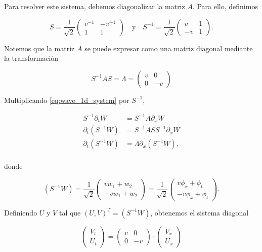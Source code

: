 \documentclass[12pt]{article}
\begin{document}
Para resolver este sistema, debemos diagonalizar la matriz $A$. Para ello, definimos

\begin{equation}
S = \dfrac{1}{\sqrt{2}}
\begin{pmatrix}
v^{-1} & -v^{-1} \\
1 & 1
\end{pmatrix} \quad \text{y} \quad
S^{-1} = \dfrac{1}{\sqrt{2}} 
\begin{pmatrix}
v & 1 \\
-v & 1
\end{pmatrix}.
\end{equation}

Notemos que la matriz $A$ se puede expresar como una matriz diagonal mediante la transformaci\'on 

\begin{equation}
S^{-1} A S = \Lambda = \begin{pmatrix}
v & 0 \\
0 & -v
\end{pmatrix}
\end{equation}

Multiplicando \ref{eq:wave_1d_system} por $S^{-1}$,

\begin{align*}
S^{-1} \partial_t W &= S^{-1} A \partial_x W \\
\partial_t \left( S^{-1} W \right) &= S^{-1} A S S^{-1} \partial_x W \\
\partial_t \left( S^{-1} W \right) &= \Lambda \partial_x \left( S^{-1} W \right), \\
\end{align*}

donde 

\begin{equation}
\left( S^{-1} W \right) = \dfrac{1}{\sqrt{2}} 
\begin{pmatrix}
v w_1 + w_2 \\
-v w_1 + w_2
\end{pmatrix} =
\dfrac{1}{\sqrt{2}} 
\begin{pmatrix}
v \phi_x + \phi_t \\
-v \phi_x + \phi_t
\end{pmatrix}. 
\end{equation}

Definiendo $U$ y $V$ tal que $(U, V)^T = (S^{-1}W)$, obtenemos el sistema diagonal

\begin{equation}
\begin{pmatrix}
V_t \\
U_t
\end{pmatrix} = 
\begin{pmatrix}
v & 0 \\
0 & -v
\end{pmatrix} \cdot
\begin{pmatrix}
V_x \\
U_x
\end{pmatrix}
\end{equation}
\end{document}
